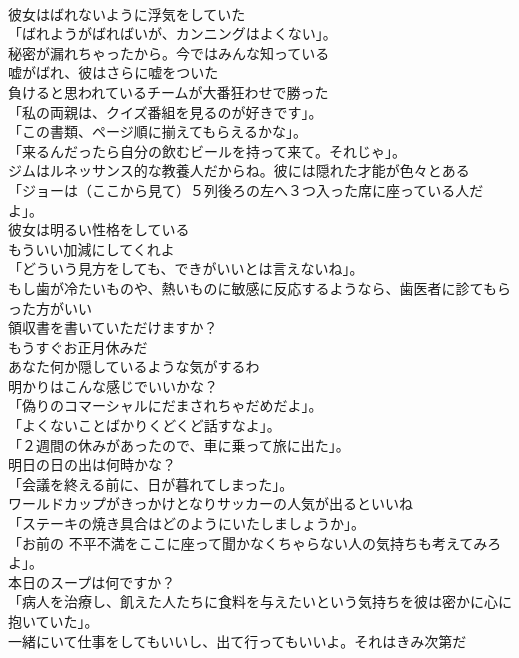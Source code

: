 \documentclass[8pt]{extreport}
\begin{document}
\begin{CJK}{UTF8}{min}
\\	彼女はばれないように浮気をしていた	
\\	「ばれようがばればいが、カンニングはよくない」。	
\\	秘密が漏れちゃったから。今ではみんな知っている	
\\	嘘がばれ、彼はさらに嘘をついた	
\\	負けると思われているチームが大番狂わせで勝った	
\\	「私の両親は、クイズ番組を見るのが好きです」。	
\\	「この書類、ページ順に揃えてもらえるかな」。	
\\	「来るんだったら自分の飲むビールを持って来て。それじゃ」。	
\\	ジムはルネッサンス的な教養人だからね。彼には隠れた才能が色々とある	
\\	「ジョーは（ここから見て）５列後ろの左へ３つ入った席に座っている人だよ」。	
\\	彼女は明るい性格をしている	
\\	もういい加減にしてくれよ	
\\	「どういう見方をしても、できがいいとは言えないね」。	
\\	もし歯が冷たいものや、熱いものに敏感に反応するようなら、歯医者に診てもらった方がいい	
\\	領収書を書いていただけますか？	
\\	もうすぐお正月休みだ	
\\	あなた何か隠しているような気がするわ	
\\	明かりはこんな感じでいいかな？	
\\	「偽りのコマーシャルにだまされちゃだめだよ」。	
\\	「よくないことばかりくどくど話すなよ」。	
\\	「２週間の休みがあったので、車に乗って旅に出た」。	
\\	明日の日の出は何時かな？	
\\	「会議を終える前に、日が暮れてしまった」。	
\\	ワールドカップがきっかけとなりサッカーの人気が出るといいね	
\\	「ステーキの焼き具合はどのようにいたしましょうか」。	
\\	「お前の 不平不満をここに座って聞かなくちゃらない人の気持ちも考えてみろよ」。	
\\	本日のスープは何ですか？	
\\	「病人を治療し、飢えた人たちに食料を与えたいという気持ちを彼は密かに心に抱いていた」。	
\\	一緒にいて仕事をしてもいいし、出て行ってもいいよ。それはきみ次第だ	

\end{CJK}
\end{document}

